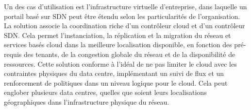Un des cas d'utilisation est l'infrastructure virtuelle d'entreprise, dans laquelle un portail basé sur SDN peut être étendu selon les particularités de l'organisation. La solution associe la coordination riche d'un contrôleur cloud et d'un contrôleur SDN. Cela permet l'instanciation, la réplication et la migration du réseau et services basés cloud dans la meilleure localisation disponible, en fonction des pré-requis des tenants, de la congestion globale du réseau et de la disponibilité de ressources. Cette solution conforme à l'idéal de ne pas limiter le cloud avec les contraintes physiques du data centre, implémentant un suivi de flux et un renforcement de politiques dans un niveau logique pour le cloud. Cela peut englober plusieurs data centres, quelles que soient leurs localisations géographiques dans l'infrastructure physique du réseau.





